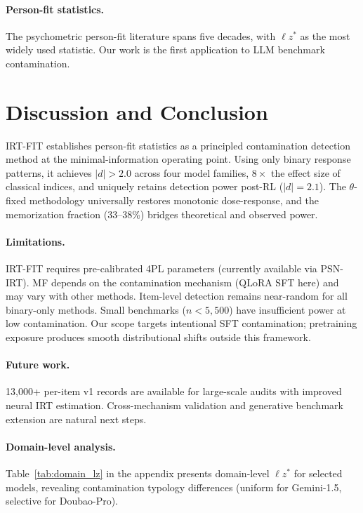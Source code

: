 \documentclass[11pt,a4paper]{article}
\begin{document}
\paragraph{Person-fit statistics.}
The psychometric person-fit literature spans five decades, with $\ell z^*$ as the most widely used statistic.
Our work is the first application to LLM benchmark contamination.

\section{Discussion and Conclusion}
\label{sec:conclusion}

IRT-FIT establishes person-fit statistics as a principled contamination detection method at the minimal-information operating point.
Using only binary response patterns, it achieves $|d| > 2.0$ across four model families, $8\times$ the effect size of classical indices, and uniquely retains detection power post-RL ($|d| = 2.1$).
The $\theta$-fixed methodology universally restores monotonic dose-response, and the memorization fraction (33--38\%) bridges theoretical and observed power.

\paragraph{Limitations.}
IRT-FIT requires pre-calibrated 4PL parameters (currently available via PSN-IRT).
MF depends on the contamination mechanism (QLoRA SFT here) and may vary with other methods.
Item-level detection remains near-random for all binary-only methods.
Small benchmarks ($n < 5{,}500$) have insufficient power at low contamination.
Our scope targets intentional SFT contamination; pretraining exposure produces smooth distributional shifts outside this framework.

\paragraph{Future work.}
13,000+ per-item v1 records are available for large-scale audits with improved neural IRT estimation.
Cross-mechanism validation and generative benchmark extension are natural next steps.

\paragraph{Domain-level analysis.}
Table~\ref{tab:domain_lz} in the appendix presents domain-level $\ell z^*$ for selected models, revealing contamination typology differences (uniform for Gemini-1.5, selective for Doubao-Pro).
\end{document}
